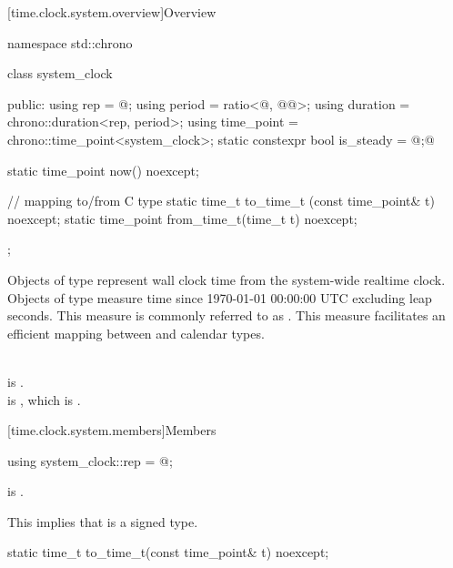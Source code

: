 [time.clock.system.overview]{Overview}
%

\begin{codeblock}
namespace std::chrono {
  class system_clock {
  public:
    using rep        = @\seebelow@;
    using period     = ratio<@\unspecnc@, @\unspec{}@>;
    using duration   = chrono::duration<rep, period>;
    using time_point = chrono::time_point<system_clock>;
    static constexpr bool is_steady = @\unspec;@

    static time_point now() noexcept;

    // mapping to/from C type 
    static time_t     to_time_t  (const time_point& t) noexcept;
    static time_point from_time_t(time_t t) noexcept;
  };
}
\end{codeblock}

\pnum
Objects of type  represent wall clock time from the system-wide
realtime clock.
Objects of type  measure time since
1970-01-01 00:00:00 UTC excluding leap seconds.
This measure is commonly referred to as .
This measure facilitates an efficient mapping between
 and calendar types.
\begin{example}
\\
 is . \\
 is ,
which is . \\
\end{example}

[time.clock.system.members]{Members}

%
\begin{itemdecl}
using system_clock::rep = @\unspec@;
\end{itemdecl}

\begin{itemdescr}
\pnum
\constraints
{} is .
\begin{note}
This implies that  is a signed type.
\end{note}
\end{itemdescr}

%
\begin{itemdecl}
static time_t to_time_t(const time_point& t) noexcept;
\end{itemdecl}

